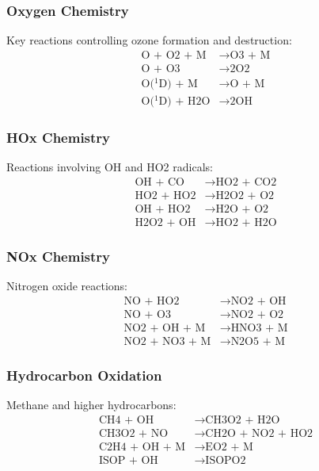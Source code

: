 \documentclass[12pt,a4paper]{article}
\begin{document}
\subsubsection{Oxygen Chemistry}
Key reactions controlling ozone formation and destruction:
\begin{align}
\text{O + O2 + M} &\rightarrow \text{O3 + M} \\
\text{O + O3} &\rightarrow \text{2O2} \\
\text{O($^1$D) + M} &\rightarrow \text{O + M} \\
\text{O($^1$D) + H2O} &\rightarrow \text{2OH}
\end{align}

\subsubsection{HOx Chemistry}
Reactions involving OH and HO2 radicals:
\begin{align}
\text{OH + CO} &\rightarrow \text{HO2 + CO2} \\
\text{HO2 + HO2} &\rightarrow \text{H2O2 + O2} \\
\text{OH + HO2} &\rightarrow \text{H2O + O2} \\
\text{H2O2 + OH} &\rightarrow \text{HO2 + H2O}
\end{align}

\subsubsection{NOx Chemistry}
Nitrogen oxide reactions:
\begin{align}
\text{NO + HO2} &\rightarrow \text{NO2 + OH} \\
\text{NO + O3} &\rightarrow \text{NO2 + O2} \\
\text{NO2 + OH + M} &\rightarrow \text{HNO3 + M} \\
\text{NO2 + NO3 + M} &\rightarrow \text{N2O5 + M}
\end{align}

\subsubsection{Hydrocarbon Oxidation}
Methane and higher hydrocarbons:
\begin{align}
\text{CH4 + OH} &\rightarrow \text{CH3O2 + H2O} \\
\text{CH3O2 + NO} &\rightarrow \text{CH2O + NO2 + HO2} \\
\text{C2H4 + OH + M} &\rightarrow \text{EO2 + M} \\
\text{ISOP + OH} &\rightarrow \text{ISOPO2}
\end{align}
\end{document}

